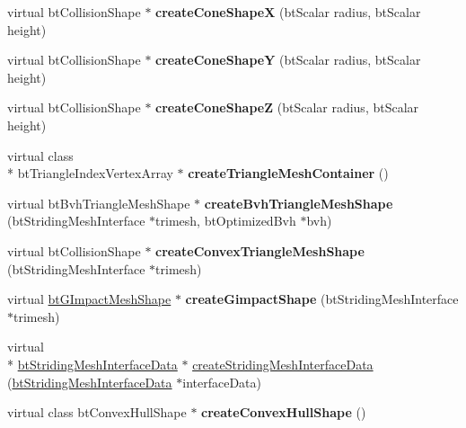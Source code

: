\begin{DoxyCompactItemize}
\item 
\hypertarget{classbt_world_importer_a832ab9f612b8b1c203331572331a8b6f}{virtual bt\+Collision\+Shape $\ast$ {\bfseries create\+Cone\+Shape\+X} (bt\+Scalar radius, bt\+Scalar height)}\label{classbt_world_importer_a832ab9f612b8b1c203331572331a8b6f}

\item 
\hypertarget{classbt_world_importer_a07318da5652fce2c896d75571e1f3200}{virtual bt\+Collision\+Shape $\ast$ {\bfseries create\+Cone\+Shape\+Y} (bt\+Scalar radius, bt\+Scalar height)}\label{classbt_world_importer_a07318da5652fce2c896d75571e1f3200}

\item 
\hypertarget{classbt_world_importer_aa0564888683ed36de5631ce58b4517f8}{virtual bt\+Collision\+Shape $\ast$ {\bfseries create\+Cone\+Shape\+Z} (bt\+Scalar radius, bt\+Scalar height)}\label{classbt_world_importer_aa0564888683ed36de5631ce58b4517f8}

\item 
\hypertarget{classbt_world_importer_ad6a3a7bbd10930809f0255251a49d708}{virtual class \\*
bt\+Triangle\+Index\+Vertex\+Array $\ast$ {\bfseries create\+Triangle\+Mesh\+Container} ()}\label{classbt_world_importer_ad6a3a7bbd10930809f0255251a49d708}

\item 
\hypertarget{classbt_world_importer_ad762d151e8577d7062402e4c9a2f0509}{virtual bt\+Bvh\+Triangle\+Mesh\+Shape $\ast$ {\bfseries create\+Bvh\+Triangle\+Mesh\+Shape} (bt\+Striding\+Mesh\+Interface $\ast$trimesh, bt\+Optimized\+Bvh $\ast$bvh)}\label{classbt_world_importer_ad762d151e8577d7062402e4c9a2f0509}

\item 
\hypertarget{classbt_world_importer_a212287733b57d34f014928f787bbe8c9}{virtual bt\+Collision\+Shape $\ast$ {\bfseries create\+Convex\+Triangle\+Mesh\+Shape} (bt\+Striding\+Mesh\+Interface $\ast$trimesh)}\label{classbt_world_importer_a212287733b57d34f014928f787bbe8c9}

\item 
\hypertarget{classbt_world_importer_adf296f26280806a8fda9d9c09be0901b}{virtual \hyperlink{classbt_g_impact_mesh_shape}{bt\+G\+Impact\+Mesh\+Shape} $\ast$ {\bfseries create\+Gimpact\+Shape} (bt\+Striding\+Mesh\+Interface $\ast$trimesh)}\label{classbt_world_importer_adf296f26280806a8fda9d9c09be0901b}

\item 
virtual \\*
\hyperlink{structbt_striding_mesh_interface_data}{bt\+Striding\+Mesh\+Interface\+Data} $\ast$ \hyperlink{classbt_world_importer_a4a4e68bd52dde1d7b87658afacd76f2c}{create\+Striding\+Mesh\+Interface\+Data} (\hyperlink{structbt_striding_mesh_interface_data}{bt\+Striding\+Mesh\+Interface\+Data} $\ast$interface\+Data)
\item 
\hypertarget{classbt_world_importer_a20960b1c062e6be022a7db52d3f25e4a}{virtual class bt\+Convex\+Hull\+Shape $\ast$ {\bfseries create\+Convex\+Hull\+Shape} ()}\label{classbt_world_importer_a20960b1c062e6be022a7db52d3f25e4a}


\end{DoxyCompactItemize}
